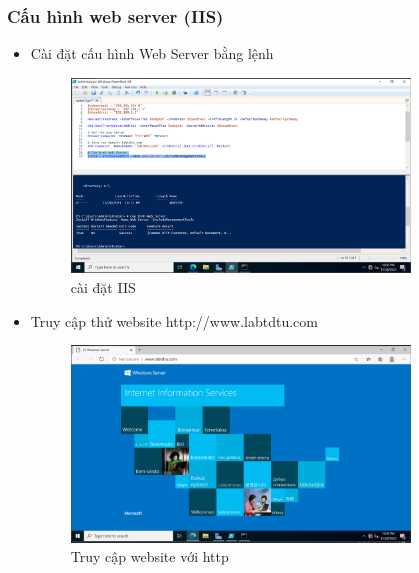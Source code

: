 \documentclass[13pt]{report}
\begin{document}
	\subsubsection{Cấu hình web server (IIS)}
	\begin{itemize}
		\item Cài đặt cấu hình Web Server bằng lệnh
		\begin{figure}[htp]
			\centering
			\includegraphics[width=0.85\textwidth]{image/PowerShell/IIS1.png}
			\caption{cài đặt IIS}
		\end{figure}
		\newpage
		\item Truy cập thử website http://www.labtdtu.com
		\begin{figure}[htp]
			\centering
			\includegraphics[width=0.85\textwidth]{image/PowerShell/IIS2.png}
			\caption{Truy cập website với http}
		\end{figure}
	\end{itemize}
\end{document}
